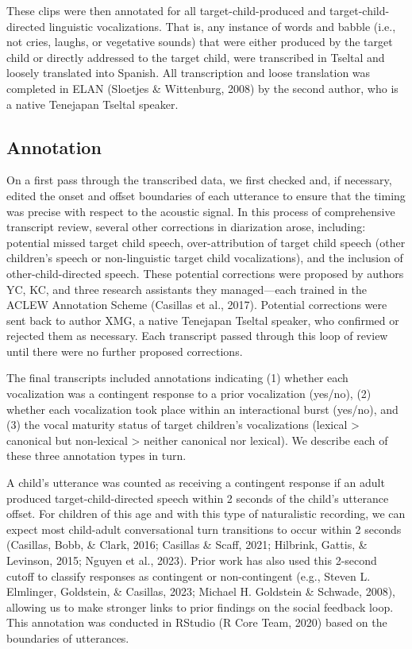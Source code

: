 \documentclass[
  man]{apa6}
\begin{document}
These clips were then annotated for all target-child-produced and target-child-directed linguistic vocalizations. That is, any instance of words and babble (i.e., not cries, laughs, or vegetative sounds) that were either produced by the target child or directly addressed to the target child, were transcribed in Tseltal and loosely translated into Spanish. All transcription and loose translation was completed in ELAN (Sloetjes \& Wittenburg, 2008) by the second author, who is a native Tenejapan Tseltal speaker.

\hypertarget{annotation}{%
\subsection{Annotation}\label{annotation}}

On a first pass through the transcribed data, we first checked and, if necessary, edited the onset and offset boundaries of each utterance to ensure that the timing was precise with respect to the acoustic signal. In this process of comprehensive transcript review, several other corrections in diarization arose, including: potential missed target child speech, over-attribution of target child speech (other children's speech or non-linguistic target child vocalizations), and the inclusion of other-child-directed speech. These potential corrections were proposed by authors YC, KC, and three research assistants they managed---each trained in the ACLEW Annotation Scheme (Casillas et al., 2017). Potential corrections were sent back to author XMG, a native Tenejapan Tseltal speaker, who confirmed or rejected them as necessary. Each transcript passed through this loop of review until there were no further proposed corrections.

The final transcripts included annotations indicating (1) whether each vocalization was a contingent response to a prior vocalization (yes/no), (2) whether each vocalization took place within an interactional burst (yes/no), and (3) the vocal maturity status of target children's vocalizations (lexical \textgreater{} canonical but non-lexical \textgreater{} neither canonical nor lexical). We describe each of these three annotation types in turn.

A child's utterance was counted as receiving a contingent response if an adult produced target-child-directed speech within 2 seconds of the child's utterance offset. For children of this age and with this type of naturalistic recording, we can expect most child-adult conversational turn transitions to occur within 2 seconds (Casillas, Bobb, \& Clark, 2016; Casillas \& Scaff, 2021; Hilbrink, Gattis, \& Levinson, 2015; Nguyen et al., 2023). Prior work has also used this 2-second cutoff to classify responses as contingent or non-contingent (e.g., Steven L. Elmlinger, Goldstein, \& Casillas, 2023; Michael H. Goldstein \& Schwade, 2008), allowing us to make stronger links to prior findings on the social feedback loop. This annotation was conducted in RStudio (R Core Team, 2020) based on the boundaries of utterances.
\end{document}
